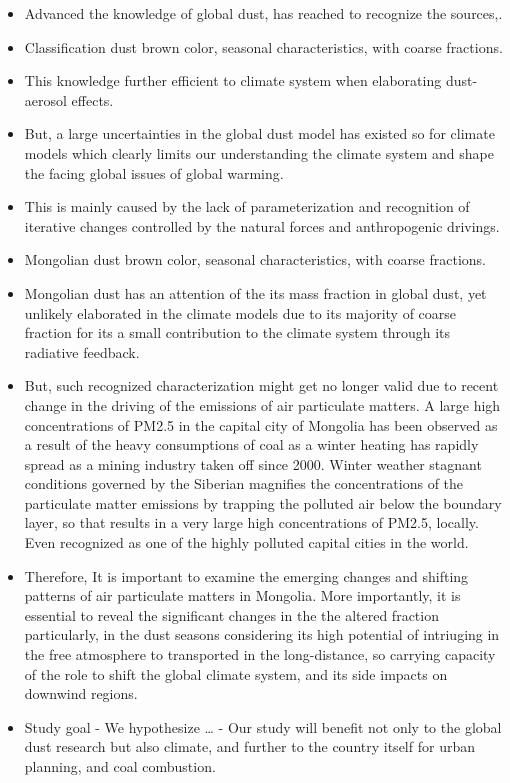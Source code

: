 \documentclass[
  11pt,
]{article}
\begin{document}
\begin{itemize}
\item
  Advanced the knowledge of global dust, has reached to recognize the
  sources,.
\item
  Classification dust brown color, seasonal characteristics, with coarse
  fractions.
\item
  This knowledge further efficient to climate system when elaborating
  dust-aerosol effects.
\item
  But, a large uncertainties in the global dust model has existed so for
  climate models which clearly limits our understanding the climate
  system and shape the facing global issues of global warming.
\item
  This is mainly caused by the lack of parameterization and recognition
  of iterative changes controlled by the natural forces and
  anthropogenic drivings.
\item
  Mongolian dust brown color, seasonal characteristics, with coarse
  fractions.
\item
  Mongolian dust has an attention of the its mass fraction in global
  dust, yet unlikely elaborated in the climate models due to its
  majority of coarse fraction for its a small contribution to the
  climate system through its radiative feedback.
\item
  But, such recognized characterization might get no longer valid due to
  recent change in the driving of the emissions of air particulate
  matters. A large high concentrations of PM2.5 in the capital city of
  Mongolia has been observed as a result of the heavy consumptions of
  coal as a winter heating has rapidly spread as a mining industry taken
  off since 2000. Winter weather stagnant conditions governed by the
  Siberian magnifies the concentrations of the particulate matter
  emissions by trapping the polluted air below the boundary layer, so
  that results in a very large high concentrations of PM2.5, locally.
  Even recognized as one of the highly polluted capital cities in the
  world.
\item
  Therefore, It is important to examine the emerging changes and
  shifting patterns of air particulate matters in Mongolia. More
  importantly, it is essential to reveal the significant changes in the
  the altered fraction particularly, in the dust seasons considering its
  high potential of intriuging in the free atmosphere to transported in
  the long-distance, so carrying capacity of the role to shift the
  global climate system, and its side impacts on downwind regions.
\item
  Study goal - We hypothesize \ldots{} - Our study will benefit not only
  to the global dust research but also climate, and further to the
  country itself for urban planning, and coal combustion.
\end{itemize}
\end{document}
